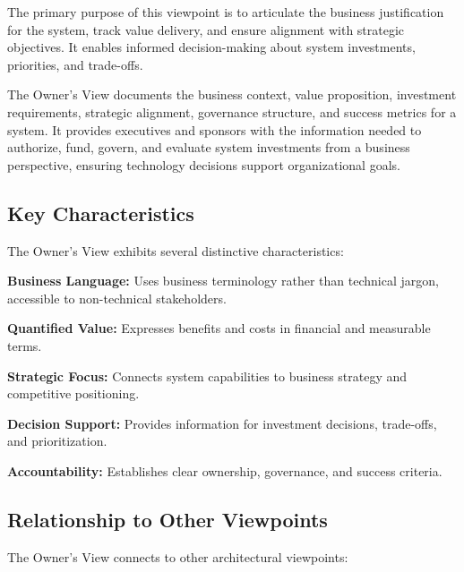 \documentclass[11pt,letterpaper]{article}
\begin{document}
The primary purpose of this viewpoint is to articulate the business justification for the system, track value delivery, and ensure alignment with strategic objectives. It enables informed decision-making about system investments, priorities, and trade-offs.

\begin{definitionbox}
The Owner's View documents the business context, value proposition, investment requirements, strategic alignment, governance structure, and success metrics for a system. It provides executives and sponsors with the information needed to authorize, fund, govern, and evaluate system investments from a business perspective, ensuring technology decisions support organizational goals.
\end{definitionbox}

\subsection{Key Characteristics}

The Owner's View exhibits several distinctive characteristics:

\textbf{Business Language:} Uses business terminology rather than technical jargon, accessible to non-technical stakeholders.

\textbf{Quantified Value:} Expresses benefits and costs in financial and measurable terms.

\textbf{Strategic Focus:} Connects system capabilities to business strategy and competitive positioning.

\textbf{Decision Support:} Provides information for investment decisions, trade-offs, and prioritization.

\textbf{Accountability:} Establishes clear ownership, governance, and success criteria.

\subsection{Relationship to Other Viewpoints}

The Owner's View connects to other architectural viewpoints:
\end{document}
